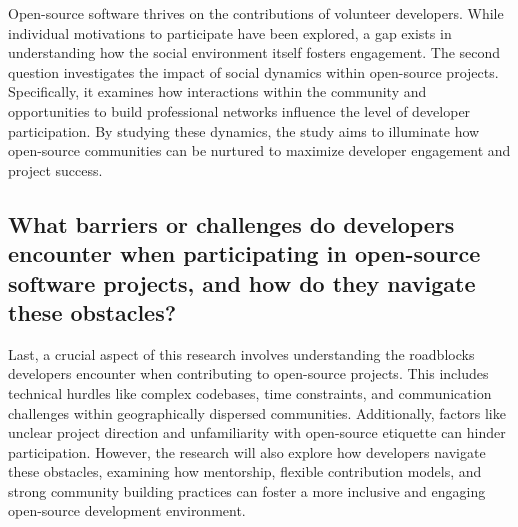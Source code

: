 Open-source software thrives on the contributions of volunteer developers. While individual motivations to participate have been explored, a gap exists in understanding how the social environment itself fosters engagement. The second question investigates the impact of social dynamics within open-source projects. Specifically, it examines how interactions within the community and opportunities to build professional networks influence the level of developer participation. By studying these dynamics, the study aims to illuminate how open-source communities can be nurtured to maximize developer engagement and project success.


\subsection{What barriers or challenges do developers encounter when participating in open-source software projects, and how do they navigate these obstacles?}

Last, a crucial aspect of this research involves understanding the roadblocks developers encounter when contributing to open-source projects. This includes technical hurdles like complex codebases, time constraints, and communication challenges within geographically dispersed communities. Additionally, factors like unclear project direction and unfamiliarity with open-source etiquette can hinder participation. However, the research will also explore how developers navigate these obstacles, examining how mentorship, flexible contribution models, and strong community building practices can foster a more inclusive and engaging open-source development environment.


\clearpage  %
